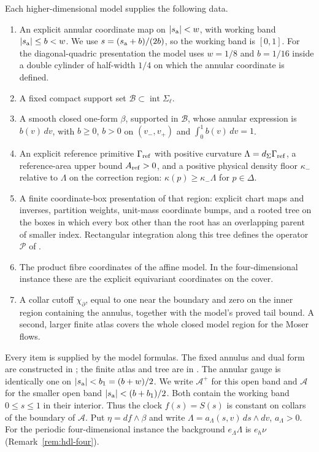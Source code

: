 \begin{definition}\label{def:hdl-handle-data}
Each higher-dimensional model supplies the following data.
\begin{enumerate}[label=(\alph*)]
\item An explicit annular coordinate map on $|s_{\rm a}|<w$, with working band
$|s_{\rm a}|\le b<w$. We use $s=(s_{\rm a}+b)/(2b)$, so the working band is $[0,1]$.
For the diagonal-quadric presentation the model uses $w=1/8$ and $b=1/16$ inside a double cylinder of half-width $1/4$ on which the annular coordinate is defined.
\item A fixed compact support set $\mathcal B\subset\operatorname{int}\Sigma_\ell$.
\item A smooth closed one-form $\beta$, supported in $\mathcal B$, whose annular expression is
$b(v)\,dv$, with $b\ge0$, $b>0$ on $(v_-,v_+)$ and $\int_0^1b(v)\,dv=1$.
\item An explicit reference primitive $\Gamma_{\rm ref}$ with positive curvature
$\Lambda=d_\Sigma\Gamma_{\rm ref}$, a reference-area upper bound $A_{\rm ref}>0$, and a positive
physical density floor $\kappa_-$ relative to $\Lambda$ on the correction region:
$\kappa(p)\ge\kappa_-\Lambda$ for $p\in\Delta$.
\item A finite coordinate-box presentation of that region: explicit chart maps and inverses,
partition weights, unit-mass coordinate bumps, and a rooted tree on the boxes in which every box other than the root has an overlapping parent of smaller index.
Rectangular integration along this tree defines the operator $\mathcal P$ of .
\item The product fibre coordinates of the affine model. In the four-dimensional instance these
are the explicit equivariant coordinates on the cover.
\item A collar cutoff $\chi_\partial$, equal to one near the boundary and zero on the inner region
containing the annulus, together with the model's proved tail bound. A second, larger finite atlas
covers the whole closed model region for the Moser flows.
\end{enumerate}
\end{definition}

Every item is supplied by the model formulas. The fixed annulus and dual form are constructed in
; the finite atlas and tree are in .
The annular gauge is identically one on $|s_{\rm a}|<b_1=(b+w)/2$.
We write $\mathcal A^+$ for this open band and $\mathcal A$ for the smaller open band
$|s_{\rm a}|<(b+b_1)/2$. Both contain the working band $0\le s\le1$ in their interior.
Thus the clock $f(s)=S(s)$ is constant on collars of the boundary of $\mathcal A$.
Put $\eta=df\wedge\beta$ and write
$\Lambda=a_\Lambda(s,v)\,ds\wedge dv$, $a_\Lambda>0$.
For the periodic four-dimensional instance the background $e_\Lambda\Lambda$ is $e_h\nu$ (Remark~\ref{rem:hdl-four}).

